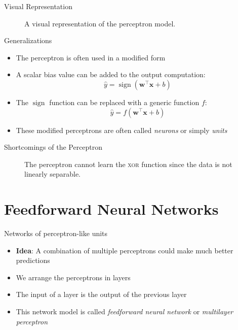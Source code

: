 \documentclass{beamer}
\DeclareMathOperator{\sign}{sign}
\begin{document}
	\begin{frame}{Visual Representation}
		\begin{figure}
			
			\caption{A visual representation of the perceptron model.}
		\end{figure}
	\end{frame}
	\begin{frame}{Generalizations}
		\begin{itemize}
			\item <1-> The perceptron is often used in a modified form
			\item <2-> A scalar bias value can be added to the output computation:
			\begin{equation}
			\hat{y} = \sign\left (\bm{w}^\top\bm{x} + b\right )
			\end{equation}
			\item <3-> The $\sign$ function can be replaced with a generic function $f$:
			\begin{equation}
			\hat{y} = f\left (\bm{w}^\top\bm{x} + b\right )
			\end{equation}
			\item <4> These modified perceptrons are often called \emph{neurons} or simply \emph{units}
		\end{itemize}
	\end{frame}
	\begin{frame}{Shortcomings of the Perceptron}
		\begin{figure}
						
			\caption{The perceptron cannot learn the \textsc{xor} function since the data is not linearly separable.}
		\end{figure}
	\end{frame}
	
	\section{Feedforward Neural Networks}
	
	\begin{frame}{Networks of perceptron-like units}
		\begin{itemize}
			\item <1-> \textbf{Idea}: A combination of multiple perceptrons could make much better predictions
			\item <2-> We arrange the perceptrons in layers
			\item <3-> The input of a layer is the output of the previous layer
			\item <4-> This network model is called \emph{feedforward neural network} or \emph{multilayer perceptron}
		\end{itemize}
	\end{frame}
	
\end{document}
